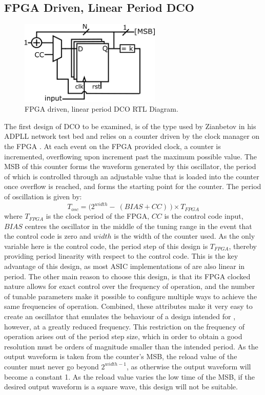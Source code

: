 \subsection{\acs{FPGA} Driven, Linear Period \acs{DCO}}
\begin{figure}[h]
	\centering
	\includegraphics[width=0.6\textwidth]{../osc1}
	\caption{\acs{FPGA} driven, linear period \acs{DCO} \ac{RTL} Diagram.}
	\label{fig:osc1}
\end{figure}
The first design of \ac{DCO} to be examined, is of the type used by Zianbetov in his \ac{ADPLL} network test bed and relies on a counter driven by the clock manager on the \ac{FPGA} \cite{zianbetov2013phd}. At each event on the \ac{FPGA} provided clock, a counter is incremented, overflowing upon increment past the maximum possible value. The \ac{MSB} of this counter forms the waveform generated by this oscillator, the period of which is controlled through an adjustable value that is loaded into the counter once overflow is reached, and forms the starting point for the counter. The period of oscillation is given by:
\begin{equation}
	T_{osc} = \big(2^{width} -~(BIAS+CC)~\big)\times T_{FPGA}
\end{equation}
where $T_{FPGA}$ is the clock period of the \ac{FPGA}, $CC$ is the control code input, $BIAS$ centres the oscillator in the middle of the tuning range in the event that the control code is zero and $width$ is the width of the counter used. As the only variable here is the control code, the period step of this design is $T_{FPGA}$, thereby providing period linearity with respect to the control code. This is the key advantage of this design, as most \ac{ASIC} implementations of  are also linear in period. The other main reason to choose this design, is that its \ac{FPGA} clocked nature allows for exact control over the frequency of operation, and the number of tunable parameters make it possible to configure multiple ways to achieve the same frequencies of operation. Combined, these attributes make it very easy to create an oscillator that emulates the behaviour of a design intended for , however, at a greatly reduced frequency. This restriction on the frequency of operation arises out of the period step size, which in order to obtain a good resolution must be orders of magnitude smaller than the intended period. As the output waveform is taken from the counter's \ac{MSB}, the reload value of the counter must never go beyond $2^{width-1}$, as otherwise the output waveform will become a constant 1. As the reload value varies the low time of the \ac{MSB}, if the desired output waveform is a square wave, this design will not be suitable.

